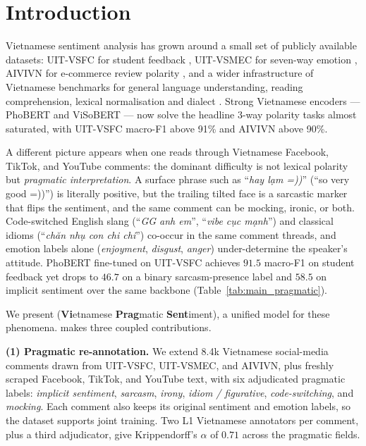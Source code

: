 \section{Introduction}

Vietnamese sentiment analysis has grown around a small set of
publicly available datasets: UIT-VSFC for student
feedback \citep{vannguyen2018uitvsfc}, UIT-VSMEC for
seven-way emotion \citep{ho2020uitvsmec}, AIVIVN for
e-commerce review polarity \citep{aivivn2019}, and a wider
infrastructure of Vietnamese benchmarks for general language
understanding, reading comprehension, lexical normalisation and
dialect \citep{vlue2024,viglue2024,nguyen2020vimmrc,vlexnorm2024,vimd2024}.
Strong Vietnamese encoders --- PhoBERT \citep{phobert2020} and
ViSoBERT \citep{visobert2023} --- now solve the headline 3-way
polarity tasks almost saturated, with UIT-VSFC macro-F1 above 91\%
and AIVIVN above 90\%.

A different picture appears when one reads through Vietnamese
Facebook, TikTok, and YouTube comments: the dominant difficulty is
not lexical polarity but \emph{pragmatic interpretation}. A surface
phrase such as ``\textit{hay l\d{a}m =))}'' (``so very good =))'') is
literally positive, but the trailing tilted face is a sarcastic
marker that flips the sentiment, and the same comment can be
mocking, ironic, or both. Code-switched English slang
(``\textit{GG anh em}'', ``\textit{vibe c\d{u}c m\d{a}nh}'') and
classical idioms (``\textit{ch\u{a}n nh\d{u} con chi chi}'')
co-occur in the same comment threads, and emotion labels alone
(\textit{enjoyment}, \textit{disgust}, \textit{anger}) under-determine
the speaker's attitude. PhoBERT fine-tuned on UIT-VSFC achieves
$91.5$ macro-F1 on student feedback yet drops to $46.7$ on a binary
sarcasm-presence label and $58.5$ on implicit sentiment over the
same backbone (Table~\ref{tab:main_pragmatic}).

We present \method{} (\textbf{Vi}etnamese \textbf{Prag}matic
\textbf{Sent}iment), a unified model for these phenomena. \method{}
makes three coupled contributions.

\textbf{(1) Pragmatic re-annotation.} We extend 8.4k Vietnamese
social-media comments drawn from UIT-VSFC, UIT-VSMEC, and AIVIVN, plus
freshly scraped Facebook, TikTok, and YouTube text, with six
adjudicated pragmatic labels: \emph{implicit sentiment},
\emph{sarcasm}, \emph{irony}, \emph{idiom / figurative},
\emph{code-switching}, and \emph{mocking}. Each comment also keeps
its original sentiment and emotion labels, so the dataset supports
joint training. Two L1 Vietnamese annotators per comment, plus a
third adjudicator, give Krippendorff's $\alpha$ of $0.71$ across the
pragmatic fields.

